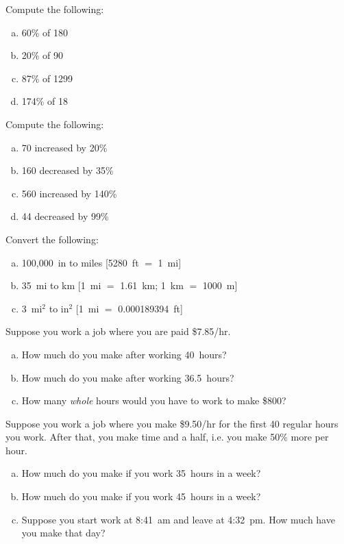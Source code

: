 \documentclass[11pt,letterpaper]{article}
\begin{document}


 Compute the following:
\begin{enumerate}[(a)]
\item 60\% of 180
\item 20\% of 90
\item 87\% of 1299
\item 174\% of 18
\end{enumerate}



\newpage



 Compute the following:
\begin{enumerate}[(a)]
\item 70 increased by 20\%
\item 160 decreased by 35\%
\item 560 increased by 140\%
\item 44 decreased by 99\%
\end{enumerate}



\newpage



 Convert the following:
\begin{enumerate}[(a)]
\item 100,000~in to miles [5280~ft $=$ 1~mi]
\item 35~mi to km [1~mi $=$ 1.61~km; 1~km $=$ 1000~m]
\item 3~mi$^2$ to in$^2$ [1~mi $=$ 0.000189394~ft]
\end{enumerate}



\newpage



 Suppose you work a job where you are paid \$7.85/hr. 
\begin{enumerate}[(a)]
\item How much do you make after working 40~hours?
\item How much do you make after working 36.5~hours?
\item How many \textit{whole} hours would you have to work to make \$800?
\end{enumerate}



\newpage



 Suppose you work a job where you make \$9.50/hr for the first 40 regular hours you work. After that, you make time and a half, i.e. you make 50\% more per hour. 
\begin{enumerate}[(a)]
\item How much do you make if you work 35~hours in a week?
\item How much do you make if you work 45~hours in a week?
\item Suppose you start work at 8:41~am and leave at 4:32~pm. How much have you make that day?
\end{enumerate}
\end{document}
